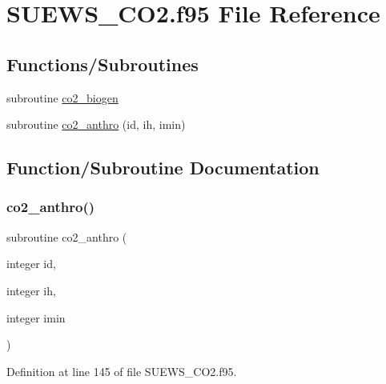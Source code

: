 \hypertarget{_s_u_e_w_s___c_o2_8f95}{}\section{S\+U\+E\+W\+S\+\_\+\+C\+O2.\+f95 File Reference}
\label{_s_u_e_w_s___c_o2_8f95}
\subsection*{Functions/\+Subroutines}
\begin{DoxyCompactItemize}
\item 
subroutine \hyperlink{_s_u_e_w_s___c_o2_8f95_a32784914a86ccd9e508a6f20eff62b59}{co2\+\_\+biogen}
\item 
subroutine \hyperlink{_s_u_e_w_s___c_o2_8f95_a3d08af1e9ac16a2e04534ba1a9018988}{co2\+\_\+anthro} (id, ih, imin)
\end{DoxyCompactItemize}


\subsection{Function/\+Subroutine Documentation}
\mbox{\label{_s_u_e_w_s___c_o2_8f95_a3d08af1e9ac16a2e04534ba1a9018988}} 
\subsubsection{\texorpdfstring{co2\+\_\+anthro()}{co2\_anthro()}}
{\footnotesize\ttfamily subroutine co2\+\_\+anthro (\begin{DoxyParamCaption}\item[{integer}]{id,  }\item[{integer}]{ih,  }\item[{integer}]{imin }\end{DoxyParamCaption})}



Definition at line 145 of file S\+U\+E\+W\+S\+\_\+\+C\+O2.\+f95.

